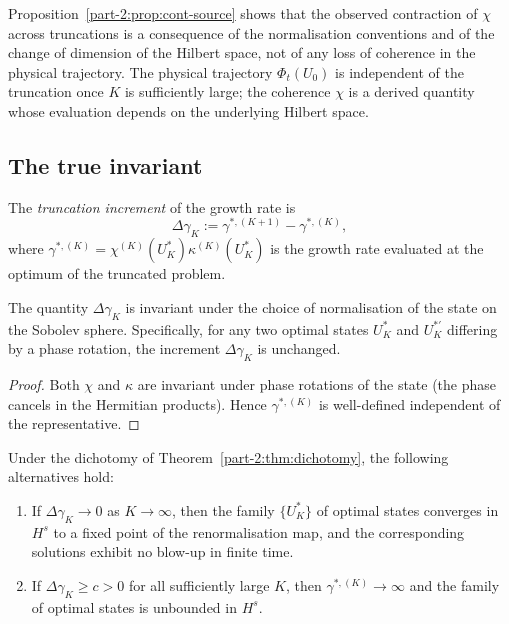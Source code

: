 \begin{remark}\label{part-2:rem:not-physical}
Proposition~\ref{part-2:prop:cont-source} shows that the observed contraction 
of $\chi$ across truncations is a consequence of the normalisation 
conventions and of the change of dimension of the Hilbert space, 
not of any loss of coherence in the physical trajectory. The 
physical trajectory $\Phi_t(U_0)$ is independent of the truncation 
once $K$ is sufficiently large; the coherence $\chi$ is a derived 
quantity whose evaluation depends on the underlying Hilbert space.
\end{remark}

\subsection{The true invariant}
\label{part-2:ssec:true-invariant}

\begin{definition}\label{part-2:def:increment}
The \emph{truncation increment} of the growth rate is
\begin{equation}\label{part-2:eq:increment}
\Delta\gamma_K := \gamma^{\ast,(K+1)} - \gamma^{\ast,(K)},
\end{equation}
where $\gamma^{\ast,(K)} = \chi^{(K)}(U^\ast_K)\kappa^{(K)}(U^\ast_K)$ 
is the growth rate evaluated at the optimum of the truncated problem.
\end{definition}

\begin{proposition}\label{part-2:prop:invariant}
The quantity $\Delta\gamma_K$ is invariant under the choice of 
normalisation of the state on the Sobolev sphere. Specifically, for 
any two optimal states $U^\ast_K$ and $U^{\ast\prime}_K$ differing by 
a phase rotation, the increment $\Delta\gamma_K$ is unchanged.
\end{proposition}

\begin{proof}
Both $\chi$ and $\kappa$ are invariant under phase rotations of the 
state (the phase cancels in the Hermitian products). Hence 
$\gamma^{\ast,(K)}$ is well-defined independent of the representative.
\end{proof}

\begin{theorem}\label{part-2:thm:trunc-criterion}
Under the dichotomy of Theorem~\ref{part-2:thm:dichotomy}, the following 
alternatives hold:
\begin{enumerate}[label=(\roman*),leftmargin=*]
\item If $\Delta\gamma_K \to 0$ as $K\to\infty$, then the family 
      $\{U^\ast_K\}$ of optimal states converges in $H^s$ to a fixed 
      point of the renormalisation map, and the corresponding 
      solutions exhibit no blow-up in finite time.
\item If $\Delta\gamma_K \geq c>0$ for all sufficiently large $K$, 
      then $\gamma^{\ast,(K)}\to\infty$ and the family of optimal 
      states is unbounded in $H^s$.
\end{enumerate}
\end{theorem}

